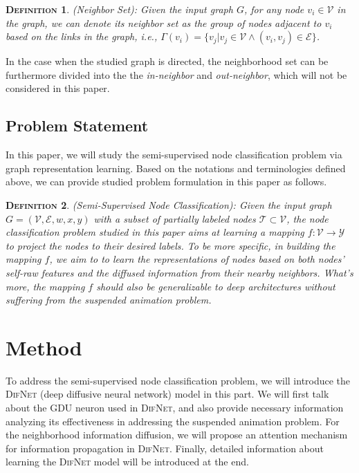 \documentclass{article}
\newcommand{\mc}{\mathcal}
\newtheorem{definition}{\textsc{Definition}}
\newcommand{\our}{\textsc{DifNet}}
\newcommand{\gdu}{\textsc{GDU}}
\begin{document}
\begin{definition}
(Neighbor Set): Given the input graph $G$, for any node $v_i \in \mc{V}$ in the graph, we can denote its neighbor set as the group of nodes adjacent to $v_i$ based on the links in the graph, i.e., $\Gamma(v_i) = \{v_j | v_j \in \mc{V} \land (v_i, v_j) \in \mc{E} \}$.
\end{definition}

In the case when the studied graph is directed, the neighborhood set can be furthermore divided into the the \textit{in-neighbor} and \textit{out-neighbor}, which will not be considered in this paper.


\subsection{Problem Statement}

In this paper, we will study the semi-supervised node classification problem via graph representation learning. Based on the notations and terminologies defined above, we can provide studied problem formulation in this paper as follows.

\begin{definition}
(Semi-Supervised Node Classification): Given the input graph $G = (\mc{V}, \mc{E}, w, x, y)$ with a subset of partially labeled nodes $\mc{T} \subset \mc{V}$, the node classification problem studied in this paper aims at learning a mapping $f: \mc{V} \to \mc{Y}$ to project the nodes to their desired labels. To be more specific, in building the mapping $f$, we aim to to learn the representations of nodes based on both nodes' self-raw features and the diffused information from their nearby neighbors. What's more, the mapping $f$ should also be generalizable to deep architectures without suffering from the suspended animation problem.
\end{definition}
\section{Method}\label{sec:method}

To address the semi-supervised node classification problem, we will introduce the {\our} (deep diffusive neural network) model in this part. We will first talk about the {\gdu} neuron used in {\our}, and also provide necessary information analyzing its effectiveness in addressing the suspended animation problem. For the neighborhood information diffusion, we will propose an attention mechanism for information propagation in {\our}. Finally, detailed information about learning the {\our} model will be introduced at the end.
\end{document}
